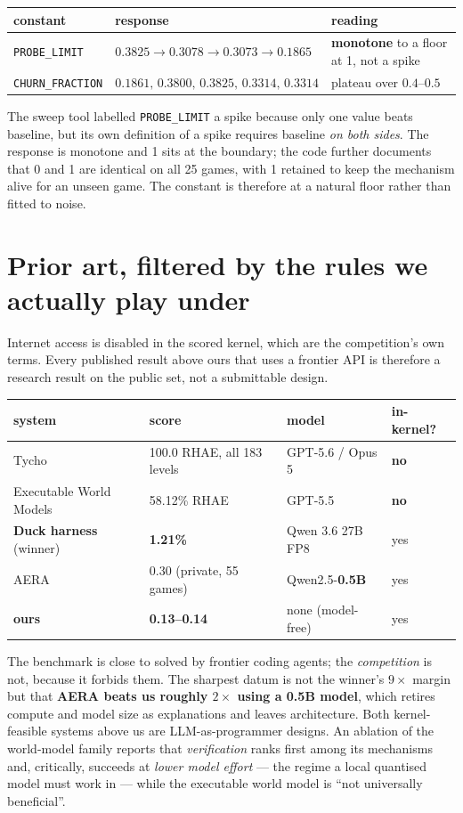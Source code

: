 \documentclass[11pt,a4paper]{article}
\begin{document}
\begin{center}
\begin{tabular}{lll}
\toprule
constant & response & reading \\
\midrule
\texttt{PROBE\_LIMIT} & $0.3825 \to 0.3078 \to 0.3073 \to 0.1865$ & \textbf{monotone} to a floor at 1, not a spike \\
\texttt{CHURN\_FRACTION} & $0.1861,\,0.3800,\,\mathbf{0.3825},\,0.3314,\,0.3314$ & plateau over $0.4$--$0.5$ \\
\bottomrule
\end{tabular}
\end{center}

The sweep tool labelled \texttt{PROBE\_LIMIT} a spike because only one value beats
baseline, but its own definition of a spike requires baseline \emph{on both sides}. The
response is monotone and 1 sits at the boundary; the code further documents that 0 and 1
are identical on all 25 games, with 1 retained to keep the mechanism alive for an unseen
game. The constant is therefore at a natural floor rather than fitted to noise.

\section{Prior art, filtered by the rules we actually play under}

Internet access is disabled in the scored kernel, which are the competition's own terms.
Every published result above ours that uses a frontier API is therefore a research
result on the public set, not a submittable design.

\begin{center}
\begin{tabular}{llll}
\toprule
system & score & model & in-kernel? \\
\midrule
Tycho & 100.0 RHAE, all 183 levels & GPT-5.6 / Opus 5 & \textbf{no} \\
Executable World Models & 58.12\% RHAE & GPT-5.5 & \textbf{no} \\
\textbf{Duck harness} (winner) & \textbf{1.21\%} & Qwen 3.6 27B FP8 & yes \\
AERA & 0.30 (private, 55 games) & Qwen2.5-\textbf{0.5B} & yes \\
\textbf{ours} & \textbf{0.13--0.14} & none (model-free) & yes \\
\bottomrule
\end{tabular}
\end{center}

The benchmark is close to solved by frontier coding agents; the \emph{competition} is
not, because it forbids them. The sharpest datum is not the winner's $9\times$ margin but
that \textbf{AERA beats us roughly $2\times$ using a 0.5B model}, which retires compute
and model size as explanations and leaves architecture. Both kernel-feasible systems
above us are LLM-as-programmer designs. An ablation of the world-model family reports
that \emph{verification} ranks first among its mechanisms and, critically, succeeds at
\emph{lower model effort} --- the regime a local quantised model must work in --- while
the executable world model is ``not universally beneficial''.
\end{document}
